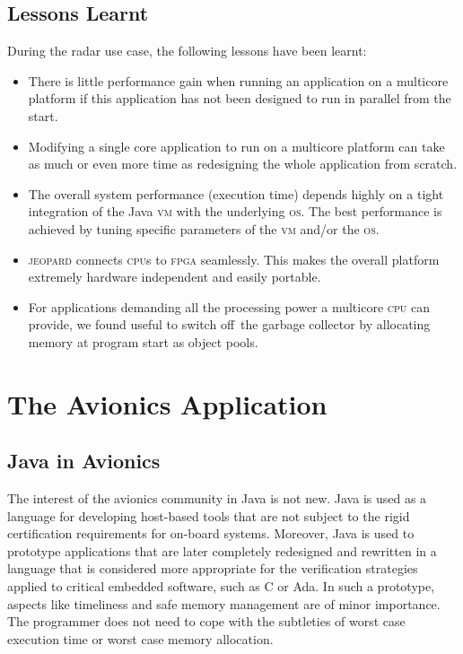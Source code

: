\documentclass{sig-alternate}
\newcommand{\acronym}[1]{\textsc{#1}}
\begin{document}
\subsection{Lessons Learnt}
During the radar use case, the following lessons have been learnt:
\begin{itemize}
\item 
There is little performance gain 
when running an application on a multicore platform 
if this application has not been designed to run in parallel from the start.

\item 
Modifying a single core application 
to run on a multicore platform 
can take as much or even more time 
as redesigning the whole application from scratch.

\item 
The overall system performance (execution time) 
depends highly on a tight integration of the Java \acronym{vm} 
with the underlying \acronym{os}. 
The best performance is achieved 
by tuning specific parameters of the \acronym{vm} and/or the \acronym{os}. 

\item 
\acronym{jeopard} connects \acronym{cpu}s to \acronym{fpga} seamlessly.
This makes the overall platform extremely hardware independent
and easily portable.

\item 
For applications demanding all the processing power a multicore \acronym{cpu} can provide, we found useful to \glqq switch off\grqq\ the garbage collector by allocating memory at program start as object pools.
\end{itemize}

\section{The Avionics Application}\label{sec:aoc}

\subsection{Java in Avionics}\label{sub:javonics}
The interest of the avionics community in Java is not new.
Java is used as a language for developing host-based tools
that are not subject to the rigid certification requirements
for on-board systems. Moreover, Java is used
to prototype applications that are later completely redesigned
and rewritten in a language that is considered more appropriate
for the verification strategies applied to critical embedded 
software, such as C or Ada.
In such a prototype, aspects like timeliness
and safe memory management are of minor importance. 
The programmer does not need to cope with the subtleties
of worst case execution time or worst case memory allocation.
\end{document}
